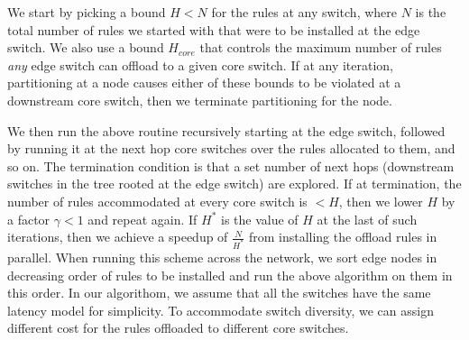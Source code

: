 We start by picking a bound $H<N$ for the rules at any switch, where $N$ is the
total number of rules we started with that were to be installed at the edge
switch. We also use a bound $H_{core}$ that controls the maximum number of rules
{\em any} edge switch can offload to a given core switch. If at any iteration,
partitioning at a node causes either of these bounds to be violated at a
downstream core switch, then we terminate partitioning for the node. 


We then run the above routine recursively starting at the edge switch,
followed by running it at the next hop core switches over the rules
allocated to them, and so on. The termination condition is that a set
number of next hops (downstream switches in the tree rooted at the
edge switch) are explored. If at termination, the number of rules
accommodated at every core switch is $<H$, then we lower $H$ by a factor
$\gamma < 1$ and repeat again. If $H^*$ is the value of $H$ at the last of
such iterations, then we achieve a speedup of $\frac{N}{H^*}$ from
installing the offload rules in parallel. When running this scheme across the network, 
we sort edge nodes in
decreasing order of rules to be installed and run the above algorithm
on them in this order. In our algorithom, we assume that all the switches
have the same latency model for simplicity. 
To accommodate switch diversity, 
we can assign different cost for the rules offloaded to different core switches.

